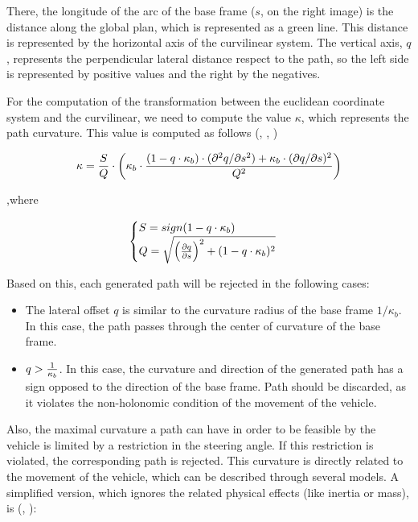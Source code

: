 There, the longitude of the arc of the base frame ($s$, on the right image) is the distance along the global plan, which is represented as a green line. This distance is represented by the horizontal axis of the curvilinear system. The vertical axis, $q$, represents the perpendicular lateral distance respect to the path, so the left side is represented by positive values and the right by the negatives.

For the computation of the transformation between the euclidean coordinate system and the curvilinear, we need to compute the value $\kappa$, which represents the path curvature. This value is computed as follows (\cite{chu2012local}, \cite{werling2010optimal}, \cite{barfoot2004motion})

\begin{equation}\label{eq:cp07_path_curvature}
 \kappa = {S \over Q} \cdot \left ( \kappa_b \cdot { 
 {(1 - q \cdot \kappa_b) \cdot (\partial^2q / \partial s^2) +
 \kappa_b \cdot (\partial q / \partial s )^2
 } 
 \over {Q^2} } \right )
\end{equation}

,where 

\begin{equation}\label{eq:cp07_path_curvature_s_and_q}
\begin{cases}
S=sign(1 - q \cdot \kappa_b)\\
Q=\sqrt{\left ( { {\partial q} \over {\partial s}} \right ) ^2+ (1 - q \cdot \kappa_b)^2}
\end{cases}
\end{equation}

Based on this, each generated path will be rejected in the following cases:
\begin{itemize}
 \item The lateral offset $q$ is similar to the curvature radius of the base frame $1 / \kappa_b$. In this case, the path passes through the center of curvature of the base frame.
 \item $q > {1 \over \kappa_b}$. In this case, the curvature and direction of the generated path has a sign opposed to the direction of the base frame. Path should be discarded, as it violates the non-holonomic condition of the movement of the vehicle.
\end{itemize}

Also, the maximal curvature a path can have in order to be feasible by the vehicle is limited by a restriction in the steering angle. If this restriction is violated, the corresponding path is rejected. This curvature is directly related to the movement of the vehicle, which can be described through several models. A simplified version, which ignores the related physical effects (like inertia or mass), is (\cite{chu2012local}, \cite{barfoot2004motion}):

